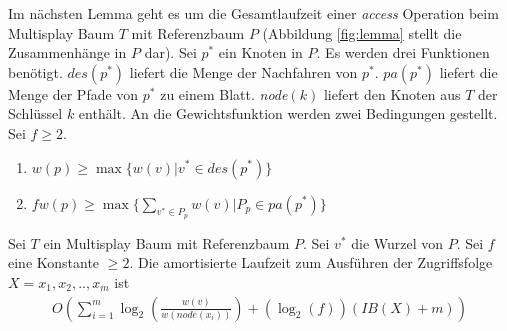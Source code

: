 \documentclass[a4paper,12pt]{article}
\begin{document}
\noindent Im nächsten Lemma geht es um die Gesamtlaufzeit einer \textit{access} Operation beim Multisplay Baum $T$ mit Referenzbaum $P$ (Abbildung \ref{fig:lemma} stellt die Zusammenhänge in $P$ dar). Sei $p^*$ ein Knoten in $P$. Es werden drei Funktionen benötigt. $\mathit{des}\left(p^*\right)$ liefert die Menge der Nachfahren von $p^*$.  $\mathit{pa}\left(p^*\right)$ liefert die Menge der Pfade von $p^*$ zu einem Blatt. \textit{node}$\left(k\right)$ liefert den Knoten aus $T$ der Schlüssel $k$ enthält. An die Gewichtsfunktion werden zwei Bedingungen gestellt. Sei $f \geq 2$.
\begin{enumerate}
	\item $w\left(p\right) \geq \max \{  w\left(v\right)\vert  v^*
	\in\mathit{des}\left(p^*\right)  \}$
	\item $f  w\left(p\right) \geq    \max \{  \sum_{v^* \in P_p }  w\left(v\right)\vert    P_p \in \mathit{pa}\left(p^*\right) \}  $
\end{enumerate}
\begin{Lemma2}
	Sei $T$ ein Multisplay Baum mit Referenzbaum $P$. Sei $v^*$ die Wurzel von $P$. Sei $f$ eine Konstante $\geq 2$. Die amortisierte Laufzeit zum Ausführen der Zugriffsfolge $X = x_1, x_2,..,x_m$ ist 
	\begin{align*}
	O\left(  \sum_{i = 1}^{m} \log_2\left(   \frac{w\left(v\right)}{w\left(\textit{node}\left(x_i\right)\right)}  \right)  
	+ \left(\log_2\left( f\right)\right) \left(\mathit{IB}\left(X\right) + m\right) \right)
	\end{align*}
\end{Lemma2}
\end{document}
